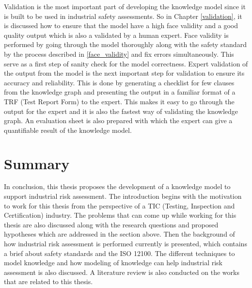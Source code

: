 Validation is the most important part of developing the knowledge model since it is built to be used in industrial safety assessments. So in Chapter \ref{validation}, it is discussed how to ensure that the model have a high face validity and a good quality output which is also a validated by a human expert. Face validity is performed by going through the model thoroughly along with the safety standard by the process described in \ref{face_validity} and fix errors simultaneously. This serve as a first step of sanity check for the model correctness. Expert validation of the output from the model is the next important step for validation to ensure its accuracy and reliability. This is done by generating a checklist for few clauses from the knowledge graph and presenting the output in a familiar format of a TRF (Test Report Form) to the expert. This makes it easy to go through the output for the expert and it is also the fastest way of validating the knowledge graph. An evaluation sheet is also prepared with which the expert can give a quantifiable result of the knowledge model.

\section{Summary}

In conclusion, this thesis proposes the development of a knowledge model to support industrial risk assessment. The introduction begins with the motivation to work for this thesis from the perspective of a TIC (Testing, Inspection and Certification) industry. The problems that can come up while working for this thesis are also discussed along with the research questions and proposed hypotheses which are addressed in the section above. Then the background of how industrial risk assessment is performed currently is presented, which contains a brief about safety standards and the ISO 12100. The different techniques to model knowledge and how modeling of knowledge can help industrial risk assessment is also discussed. A literature review is also conducted on the works that are related to this thesis.

